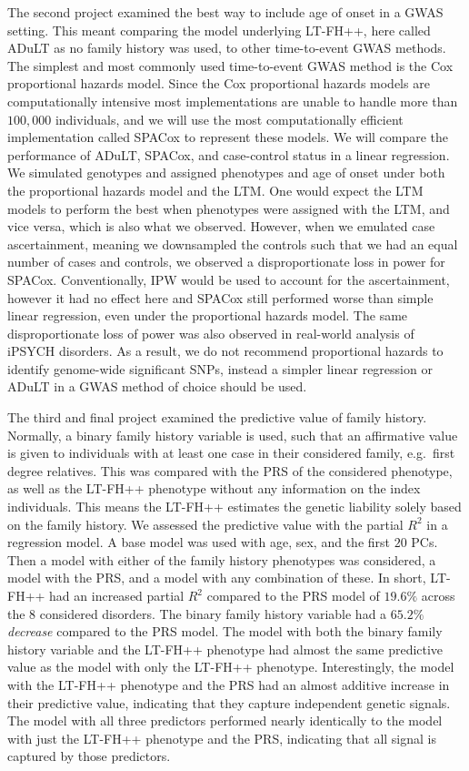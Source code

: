 The second project examined the best way to include age of onset in a GWAS setting. This meant comparing the model underlying LT-FH++, here called ADuLT as no family history was used, to other time-to-event GWAS methods. The simplest and most commonly used time-to-event GWAS method is the Cox proportional hazards model. Since the Cox proportional hazards models are computationally intensive most implementations are unable to handle more than $ 100,000 $ individuals, and we will use the most computationally efficient implementation called SPACox to represent these models. We will compare the performance of ADuLT, SPACox, and case-control status in a linear regression. We simulated genotypes and assigned phenotypes and age of onset under both the proportional hazards model and the LTM. One would expect the LTM models to perform the best when phenotypes were assigned with the LTM, and vice versa, which is also what we observed. However, when we emulated case ascertainment, meaning we downsampled the controls such that we had an equal number of cases and controls, we observed a disproportionate loss in power for SPACox. Conventionally, IPW would be used to account for the ascertainment, however it had no effect here and SPACox still performed worse than simple linear regression, even under the proportional hazards model. The same disproportionate loss of power was also observed in real-world analysis of iPSYCH disorders. As a result, we do not recommend proportional hazards to identify genome-wide significant SNPs, instead a simpler linear regression or ADuLT in a GWAS method of choice should be used.

The third and final project examined the predictive value of family history. Normally, a binary family history variable is used, such that an affirmative value is given to individuals with at least one case in their considered family, e.g.\ first degree relatives. This was compared with the PRS of the considered phenotype, as well as the LT-FH++ phenotype without any information on the index individuals. This means the LT-FH++ estimates the genetic liability solely based on the family history. We assessed the predictive value with the partial $ R^2 $ in a regression model. A base model was used with age, sex, and the first $ 20 $ PCs. Then a model with either of the family history phenotypes was considered, a model with the PRS, and a model with any combination of these. In short, LT-FH++ had an increased partial $ R^2 $ compared to the PRS model of $ 19.6\% $ across the $ 8 $ considered disorders. The binary family history variable had a $ 65.2\% $ \textit{decrease} compared to the PRS model. The model with both the binary family history variable and the LT-FH++ phenotype had almost the same predictive value as the model with only the LT-FH++ phenotype. Interestingly, the model with the LT-FH++ phenotype and the PRS had an almost additive increase in their predictive value, indicating that they capture independent genetic signals. The model with all three predictors performed nearly identically to the model with just the LT-FH++ phenotype and the PRS, indicating that all signal is captured by those predictors. 
 
